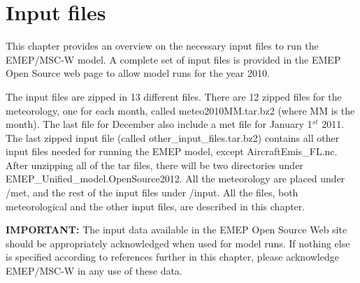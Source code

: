 \chapter{Input files}
\label{ch:InputFiles}

This chapter provides an overview on the necessary input files to run 
the EMEP/MSC-W model. A complete set of input files is provided in
the EMEP Open Source web page to allow model runs for the year 2010. 

The input files are zipped in 13 different files. 
There are 12 zipped files for the meteorology, one for each month, called meteo2010MM.tar.bz2 (where MM 
is the month). 
The last file for December also include a met file for January 1$^{st}$ 2011. 
The last zipped input file (called other\_input\_files.tar.bz2) contains all other input 
files needed for running the EMEP model, except AircraftEmis\_FL.nc.
After unzipping all of the tar files, there will be two directories under EMEP\_Unified\_model.OpenSource2012. 
All the meteorology are placed under /met, and the rest of the input files under /input. 
All the files, both meteorological and 
the other input files, are described in this chapter.

{\bf IMPORTANT:} The input data available in the EMEP Open Source Web
site should be appropriately acknowledged when used for model runs.
If nothing else is specified according to references further in this
chapter, please acknowledge EMEP/MSC-W in
any use of these data.



